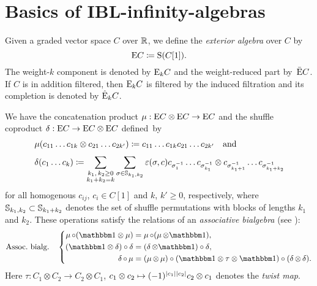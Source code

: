 \documentclass[\MainFolder/Text.tex]{subfiles}
\begin{document}
\section{Basics of IBL-infinity-algebras
}
\label{Sec:Alg1}

\begin{Definition}\label{Def:ExtAlg}
Given a graded vector space $C$ over $\mathbb{R}$, we define the \emph{exterior algebra} over $C$ by
$$ \mathrm{E} C \coloneqq \mathrm{S}(C[1]). $$
The weight-$k$ component is denoted by $\mathrm{E}_k C$ and the weight-reduced part by~$\bar{\mathrm{E}} C$. If $C$ is in addition filtered, then $\mathrm{E}_k C$ is filtered by the induced filtration and its completion is denoted by $\hat{\mathrm{E}}_k C$.
\end{Definition}


We have the concatenation product $\operatorname{\mu} : \mathrm{E} C \otimes \mathrm{E} C \rightarrow \mathrm{E} C$ and the shuffle coproduct $\operatorname{\delta}: \mathrm{E} C \rightarrow \mathrm{E} C\otimes \mathrm{E} C$ defined~by
\begin{equation*}
\begin{aligned}
&\operatorname{\mu}(c_{11}\dots c_{1k} \otimes c_{21} \dots c_{2k'}) \coloneqq c_{11} \dots c_{1k} c_{21} \dots c_{2k'}\quad\text{and}\\[\jot]
&\operatorname{\delta}(c_1 \dots c_k) \coloneqq \sum_{\substack{k_1,\,k_2 \ge 0\\ k_1 + k_2 = k}} \sum_{\sigma\in \mathbb{S}_{k_1, k_2}} \varepsilon(\sigma,c) c_{\sigma^{-1}_1} \dots c_{\sigma_{k_1}^{-1}}\otimes c_{\sigma_{k_1+1}^{-1}}\dots c_{\sigma_{k_1 + k_2}^{-1}}
\end{aligned}
\end{equation*}
for all homogenous $c_{ij}$, $c_i \in C[1]$ and $k$, $k'\ge 0$, respectively, where $\mathbb{S}_{k_1, k_2}\subset \mathbb{S}_{k_1+k_2}$ denotes the set of shuffle permutations with blocks of lengths $k_1$ and $k_2$. These operations satisfy the relations of an \emph{associative bialgebra} (see \cite{Loday2012}):
\begin{equation}\label{Eq:Bialgebra}
\text{Assoc.~bialg.}\quad \left\{
\begin{aligned}
\Prod\circ (\Id\otimes \Prod) &= \Prod\circ (\Prod \otimes \Id), \\ 
(\Id\otimes \CoProd)\circ\CoProd &= (\CoProd\otimes \Id)\circ \CoProd, \\
\CoProd \circ \Prod &= (\Prod\otimes \Prod) \circ (\Id \otimes \tau\otimes \Id) \circ (\CoProd\otimes \CoProd).
\end{aligned} \right.
\end{equation}
Here $\tau: C_1 \otimes C_2 \rightarrow C_2 \otimes C_1$, $c_1\otimes c_2 \mapsto (-1)^{|c_1||c_2|}c_2\otimes c_1$ denotes the \emph{twist map}.
\end{document}
